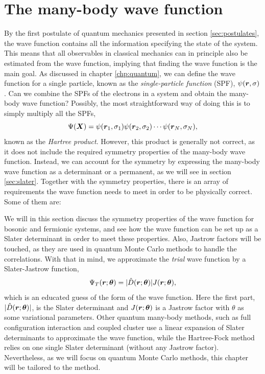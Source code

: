 \section{The many-body wave function} \label{sec:wavefunction}
By the first postulate of quantum mechanics presented in section \ref{sec:postulates}, the wave function contains all the information specifying the state of the system. This means that all observables in classical mechanics can in principle also be estimated from the wave function, implying that finding the wave function is the main goal. As discussed in chapter \ref{chp:quantum}, we can define the wave function for a single particle, known as the \textit{single-particle function} (SPF), $\psi(\boldsymbol{{r}},\sigma)$. Can we combine the SPFs of the electrons in a system and obtain the many-body wave function? Possibly, the most straightforward way of doing this is to simply multiply all the SPFs,
\begin{equation}
\Psi(\boldsymbol{{X}})=\psi(\boldsymbol{{r}}_1,\sigma_1)\psi(\boldsymbol{{r}}_2,\sigma_2)\cdots\psi(\boldsymbol{{r}}_N,\sigma_N),
\end{equation}
known as the \textit{Hartree product}. However, this product is generally not correct, as it does not include the required symmetry properties of the many-body wave function. Instead, we can account for the symmetry by expressing the many-body wave function as a determinant or a permanent, as we will see in section \ref{sec:slater}. Together with the symmetry properties, there is an array of requirements the wave function needs to meet in order to be physically correct. Some of them are:

\iffalse
We will in this section discuss the symmetry properties of the wave function for bosonic and fermionic systems, and see how the wave function can be set up as a Slater determinant in order to meet these properties. Also, Jastrow factors will be touched, as they are used in quantum Monte Carlo methods to handle the correlations. With that in mind, we approximate the \textit{trial} wave function by a Slater-Jastrow function,
\begin{equation}
\Psi_T(\boldsymbol{{r}};\boldsymbol{{\theta}})=|\hat{D}(\boldsymbol{{r}};\boldsymbol{{\theta}})|J(\boldsymbol{{r}};\boldsymbol{{\theta}}),
\end{equation}
which is an educated guess of the form of the wave function. 
Here the first part, $|\hat{D}(\boldsymbol{{r}};\boldsymbol{{\theta}})|$, is the Slater determinant and $J(\boldsymbol{{r}};\boldsymbol{{\theta}})$ is a Jastrow factor with $\theta$ as some variational parameters. Other quantum many-body methods, such as full configuration interaction and coupled cluster use a linear expansion of Slater determinants to approximate the wave function, while the Hartree-Fock method relies on one single Slater determinant (without any Jastrow factor). Nevertheless, as we will focus on quantum Monte Carlo methods, this chapter will be tailored to the method. 

